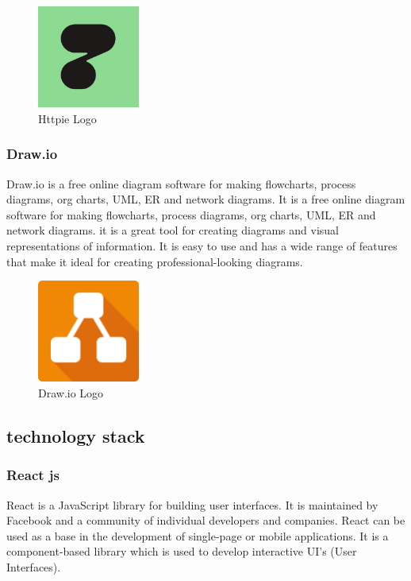 \begin{figure}[h!]
      \centering
      \includegraphics[width=0.3\textwidth]{images/httpie.png}
      \caption{Httpie Logo}
      \label{fig:httpie}
\end{figure}

\subsubsection{Draw.io}
Draw.io is a free online diagram software for making flowcharts, process
diagrams, org charts, UML, ER and network diagrams. It is a free online diagram
software for making flowcharts, process diagrams, org charts, UML, ER and
network diagrams.
it is a great tool for creating diagrams and visual representations of
information. It is easy to use and has a wide range of features that make it
ideal for creating professional-looking diagrams.

\begin{figure}[h!]
      \centering
      \includegraphics[width=0.3\textwidth]{images/drawio.png}
      \caption{Draw.io Logo}
      \label{fig:drawio}
\end{figure}
\bigbreak

\newpage
\subsection{technology stack}
\subsubsection{React js}
React is a JavaScript library for building user interfaces. It is maintained by
Facebook and a community of individual developers and companies. React can be
used as a base in the development of single-page or mobile applications. It is
a component-based library which is used to develop interactive UI's (User
Interfaces).

